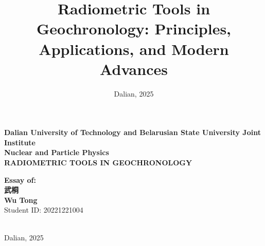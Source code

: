 \documentclass{article}
\title{Radiometric Tools in Geochronology: Principles, Applications, and Modern Advances}
\date{Dalian, 2025}
\begin{document}
\begin{titlepage}
    \centering
    \vspace*{2cm}
    {\Large \textbf{Dalian University of Technology and Belarusian State University Joint Institute}} \\
    \vspace{1cm}
    {\Huge \textbf{Nuclear and Particle Physics}} \\
    \vspace{2cm}
    {\Large \textbf{RADIOMETRIC TOOLS IN GEOCHRONOLOGY}} \\
    \vspace{3cm}
    \begin{flushright} 
{\Large \textbf{Essay of:}}\qquad \\[0.5cm]
{\Large \textbf{武桐}} \\[0.5cm]
{\Large \textbf{Wu Tong}} \\[0.5cm]
{\Large Student ID: 20221221004}
    \end{flushright} \\
    \vspace{8cm}
    {\Large Dalian, 2025}
\end{titlepage}
\end{document}
